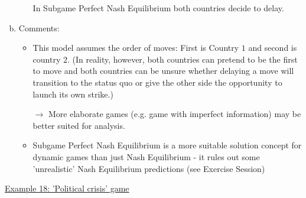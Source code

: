 \begin{enumerate}[a)]
\begin{enumerate}[c1)]
                In Subgame Perfect Nash Equilibrium both countries decide to delay.
        \end{enumerate}
    \item Comments:
        \begin{itemize}
            \item This model assumes the order of moves: First is Country $1$
                and second is country $2$. (In reality, however, both countries
                can pretend to be the first to move and both countries can be
                unsure whether delaying a move will transition to the status quo
                or give the other side the opportunity to launch its own strike.)
                
                $\rightarrow$ More elaborate games (e.g. game with imperfect
                information) may be better suited for analysis.
            \item Subgame Perfect Nash Equilibrium is a more suitable solution
                concept for dynamic games than just Nash Equilibrium - it rules
                out some 'unrealistic' Nash Equilibrium predictions (see Exercise
                Session)
        \end{itemize}
\end{enumerate}

\vspace{1\baselineskip}

\underline{Example 18: 'Political crisis' game}

